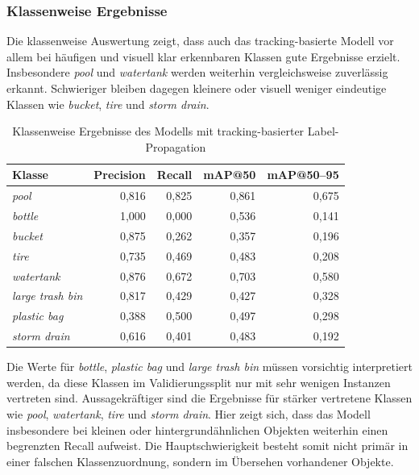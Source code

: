 \subsubsection{Klassenweise Ergebnisse}

Die klassenweise Auswertung zeigt, dass auch das tracking-basierte Modell vor
allem bei häufigen und visuell klar erkennbaren Klassen gute Ergebnisse erzielt.
Insbesondere \textit{pool} und \textit{watertank} werden weiterhin vergleichsweise
zuverlässig erkannt. Schwieriger bleiben dagegen kleinere oder visuell weniger
eindeutige Klassen wie \textit{bucket}, \textit{tire} und \textit{storm drain}.

\begin{table}[H]
    \centering
    \caption{Klassenweise Ergebnisse des Modells mit tracking-basierter Label-Propagation}
    \label{tab:tracking_classwise_metrics}
    \begin{tabular}{lrrrr}
        \hline
        \textbf{Klasse}          & \textbf{Precision} & \textbf{Recall} & \textbf{mAP@50} & \textbf{mAP@50--95} \\
        \hline
        \textit{pool}            & 0{,}816            & 0{,}825         & 0{,}861         & 0{,}675             \\
        \textit{bottle}          & 1{,}000            & 0{,}000         & 0{,}536         & 0{,}141             \\
        \textit{bucket}          & 0{,}875            & 0{,}262         & 0{,}357         & 0{,}196             \\
        \textit{tire}            & 0{,}735            & 0{,}469         & 0{,}483         & 0{,}208             \\
        \textit{watertank}       & 0{,}876            & 0{,}672         & 0{,}703         & 0{,}580             \\
        \textit{large trash bin} & 0{,}817            & 0{,}429         & 0{,}427         & 0{,}328             \\
        \textit{plastic bag}     & 0{,}388            & 0{,}500         & 0{,}497         & 0{,}298             \\
        \textit{storm drain}     & 0{,}616            & 0{,}401         & 0{,}483         & 0{,}192             \\
        \hline
    \end{tabular}
\end{table}

Die Werte für \textit{bottle}, \textit{plastic bag} und \textit{large trash bin} müssen
vorsichtig interpretiert werden, da diese Klassen im Validierungssplit nur mit sehr
wenigen Instanzen vertreten sind. Aussagekräftiger sind die Ergebnisse für stärker
vertretene Klassen wie \textit{pool}, \textit{watertank}, \textit{tire} und
\textit{storm drain}. Hier zeigt sich, dass das Modell insbesondere bei kleinen oder
hintergrundähnlichen Objekten weiterhin einen begrenzten Recall aufweist. Die
Hauptschwierigkeit besteht somit nicht primär in einer falschen Klassenzuordnung,
sondern im Übersehen vorhandener Objekte.

